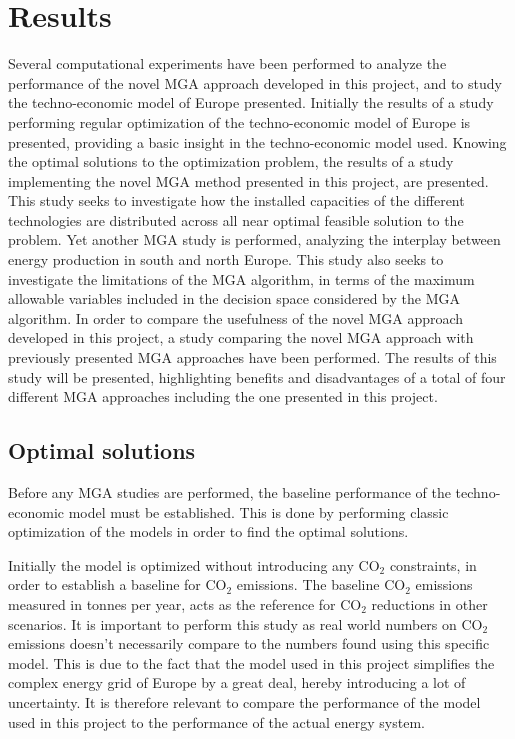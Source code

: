 
\chapter{Results}
Several computational experiments have been performed to analyze the performance of the novel MGA approach developed in this project, and to study the techno-economic model of Europe presented. Initially the results of a study performing regular optimization of the techno-economic model of Europe is presented, providing a basic insight in the techno-economic model used. Knowing the optimal solutions to the optimization problem, the results of a study implementing the novel MGA method presented in this project, are presented. This study seeks to investigate how the installed capacities of the different technologies are distributed across all near optimal feasible solution to the problem.
Yet another MGA study is performed, analyzing the interplay between energy production in south and north Europe. This study also seeks to investigate the limitations of the MGA algorithm, in terms of the maximum allowable variables included in the decision space considered by the MGA algorithm. 
In order to compare the usefulness of the novel MGA approach developed in this project, a study comparing the novel MGA approach with previously presented MGA approaches have been performed. The results of this study will be presented, highlighting benefits and disadvantages of a total of four different MGA approaches including the one presented in this project. 


\section{Optimal solutions}
Before any MGA studies are performed, the baseline performance of the techno-economic model must be established. This is done by performing classic optimization of the models in order to find the optimal solutions. 

Initially the model is optimized without introducing any $\text{CO}_2$ constraints, in order to establish a baseline for $\text{CO}_2$ emissions. The baseline $\text{CO}_2$ emissions measured in tonnes per year, acts as the reference for $\text{CO}_2$ reductions in other scenarios. It is important to perform this study as real world numbers on $\text{CO}_2$ emissions doesn't necessarily compare to the numbers found using this specific model. This is due to the fact that the model used in this project simplifies the complex energy grid of Europe by a great deal, hereby introducing a lot of uncertainty. It is therefore relevant to compare the performance of the model used in this project to the performance of the actual energy system. 

